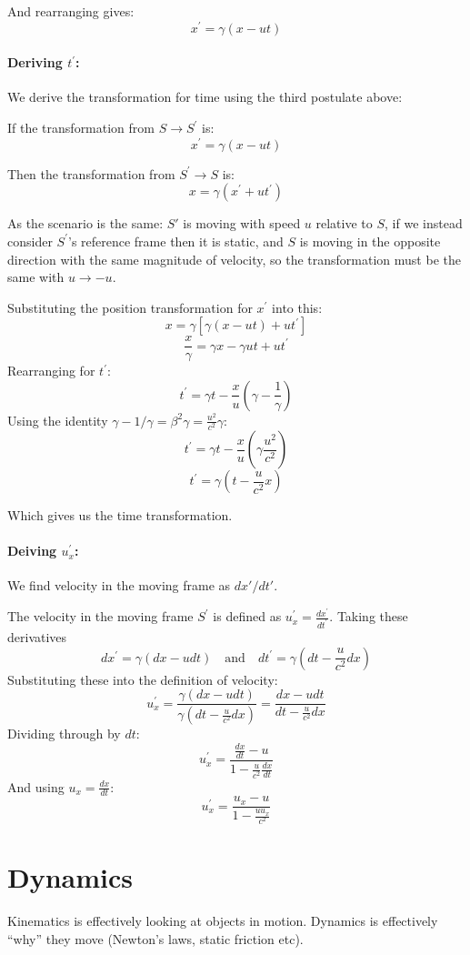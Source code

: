 And rearranging gives:
\[
    x^\prime = \gamma(x - ut)
\]
 

\paragraph{Deriving $t^\prime$:} We derive the transformation for time using the third postulate above:

If the transformation from $S \to S^\prime$ is:
\[
    x^\prime = \gamma(x - ut)
\]

Then the transformation from $S^\prime \to S$ is:
\[
    x = \gamma(x^\prime + ut^\prime)
\]

As the scenario is the same: $S'$ is moving with speed $u$ relative to $S$, if we instead consider $S^\prime$'s reference frame then it is static, and $S$ is moving in the opposite direction with the same magnitude of velocity, so the transformation must be the same with $u \to -u$.

Substituting the position transformation for $x^\prime$ into this:
\[
    x = \gamma[\gamma(x - ut) + ut^\prime]
\]
\[
    \frac{x}{\gamma} = \gamma x - \gamma ut + u t^\prime
\]
Rearranging for $t^\prime$:
\[
    t^\prime = \gamma t - \frac{x}{u}\left(\gamma - \frac{1}{\gamma}\right)
\]
Using the identity $\gamma - 1/\gamma = \beta^2\gamma = \frac{u^2}{c^2}\gamma$:
\[
    t^\prime = \gamma t - \frac{x}{u}\left(\gamma \frac{u^2}{c^2}\right)
\]
\[
    t^\prime = \gamma \left(t - \frac{u}{c^2}x\right)
\]

Which gives us the time transformation.

\paragraph{Deiving $u_x^\prime$: } We find velocity in the moving frame as $dx' / dt'$.

The velocity in the moving frame $S^\prime$ is defined as $u^\prime_x = \frac{dx^\prime}{dt^\prime}$. Taking these derivatives
\[
    dx^\prime = \gamma(dx - u dt) \quad \text{and} \quad dt^\prime = \gamma\left(dt - \frac{u}{c^2}dx\right)
\]
Substituting these into the definition of velocity:
\[
    u^\prime_x = \frac{\gamma(dx - u dt)}{\gamma\left(dt - \frac{u}{c^2}dx\right)} = \frac{dx - u dt}{dt - \frac{u}{c^2}dx}
\]
Dividing through by $dt$:
\[
    u^\prime_x = \frac{\frac{dx}{dt} - u}{1 - \frac{u}{c^2}\frac{dx}{dt}}
\]
And using $u_x = \frac{dx}{dt}$:
\[
    u^\prime_x = \frac{u_x - u}{1 - \frac{u u_x}{c^2}}
\]

\section{Dynamics}
Kinematics is effectively looking at objects in motion. Dynamics is effectively ``why'' they move (Newton's laws, static friction etc).

